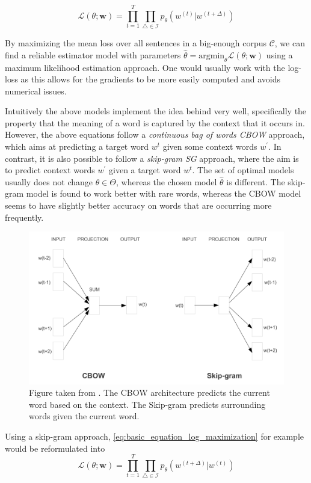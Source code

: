 \documentclass[a4paper,12pt,twoside,openright]{report}
\begin{document}
\begin{equation}
\mathcal{L}(\theta ; \mathbf{w})= \prod_{t=1}^{T} \prod_{\triangle \in \mathcal{I}} p_{\theta}\left(w^{(t)} | w^{(t +\Delta)}\right)
\end{equation}{\label{eq:basic_equation_log_maximization}}

By maximizing the mean loss over all sentences in a big-enough corpus $\mathcal{C}$, we can find a reliable estimator model with parameters $\hat{\theta} = \text{argmin}_\theta \mathcal{L}(\theta ; \mathbf{w})$ using a maximum likelihood estimation approach.
One would usually work with the log-loss as this allows for the gradients to be more easily computed and avoids numerical issues.

Intuitively the above models implement the idea  behind \cite{harris54} very well, specifically the property that the meaning of a word is captured by the context that it occurs in.
However, the above equations follow a \textit{continuous bag of words CBOW} approach, which aims at predicting a target word $w^t$ given some context words $w^{\prime}$.
In contrast, it is also possible to follow a \textit{skip-gram SG} approach, where the aim is to predict context words $w^{\prime}$ given a target word $w^t$.
The set of optimal models usually does not change $\theta \in \Theta$, whereas the chosen model $\hat{\theta}$ is different.
The skip-gram model is found to work better with rare words, whereas the CBOW model seems to have slightly better accuracy on words that are occurring more frequently.

\begin{figure}[h]
	\center
  \includegraphics[width=0.6\linewidth]{./assets/background/cbow_and_skipgram.png}
  \caption{Figure taken from \cite{mikolov13}. The CBOW architecture predicts the current word based on the context. The Skip-gram predicts surrounding words given the current word.}
  \label{fig:cbow_skipgram}
\end{figure}

Using a skip-gram approach, \eqref{eq:basic_equation_log_maximization} for example would be reformulated into 
\begin{equation}
\mathcal{L}(\theta ; \mathbf{w})=\prod_{t=1}^{T} \prod_{\triangle \in \mathcal{I}} p_{\theta}\left(w^{(t +\Delta)} | w^{(t)}\right)
\end{equation}{\label{eq:basic_equation_log_maximization_skipgram}}
\end{document}
